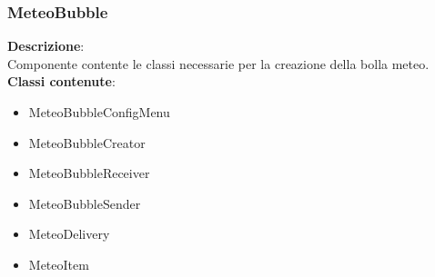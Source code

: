 \subsubsection{MeteoBubble}
   \FloatBarrier
\FloatBarrier
\textbf{Descrizione}:\\
 Componente contente le classi necessarie per la creazione della bolla meteo. 
\\ \textbf{Classi contenute}:\\
\begin{itemize}
\item MeteoBubbleConfigMenu
\item MeteoBubbleCreator
\item MeteoBubbleReceiver
\item MeteoBubbleSender
\item MeteoDelivery
\item MeteoItem
\end{itemize}


\clearpage

